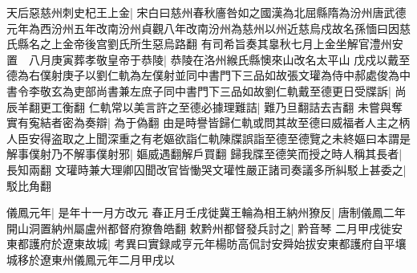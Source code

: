 天后惡慈州刺史杞王上金|{
	宋白曰慈州春秋廧咎如之國漢為北屈縣隋為汾州唐武德元年為西汾州五年改南汾州貞觀八年改南汾州為慈州以州近慈烏戍故名孫愐曰因慈氏縣名之上金帝後宫劉氏所生惡烏路翻}
有司希旨奏其辠秋七月上金坐解官澧州安置　八月庚寅葬孝敬皇帝于恭陵|{
	恭陵在洛州緱氏縣懊來山改名太平山}
戊戍以戴至德為右僕射庚子以劉仁軌為左僕射並同中書門下三品如故張文瓘為侍中郝處俊為中書令李敬玄為吏部尚書兼左庶子同中書門下三品如故劉仁軌戴至德更日受牒訴|{
	尚辰羊翻更工衡翻}
仁軌常以美言許之至德必據理難詰|{
	難乃旦翻詰去吉翻}
未嘗與奪實有寃結者密為奏辯|{
	為于偽翻}
由是時譽皆歸仁軌或問其故至德曰威福者人主之柄人臣安得盗取之上聞深重之有老嫗欲詣仁軌陳牒誤詣至德至德覽之未終嫗曰本謂是解事僕射乃不解事僕射邪|{
	嫗威遇翻解戶買翻}
歸我牒至德笑而授之時人稱其長者|{
	長知兩翻}
文瓘時兼大理卿囚聞改官皆慟哭文瓘性嚴正諸司奏議多所糾駁上甚委之|{
	駁比角翻}


儀鳳元年|{
	是年十一月方改元}
春正月壬戌徙冀王輪為相王納州獠反|{
	唐制儀鳳二年開山洞置納州屬盧州都督府獠魯皓翻}
敕黔州都督發兵討之|{
	黔音琴}
二月甲戌徙安東都護府於遼東故城|{
	考異曰實録咸亨元年楊昉高侃討安舜始拔安東都護府自平壤城移於遼東州儀鳳元年二月甲戌以}


